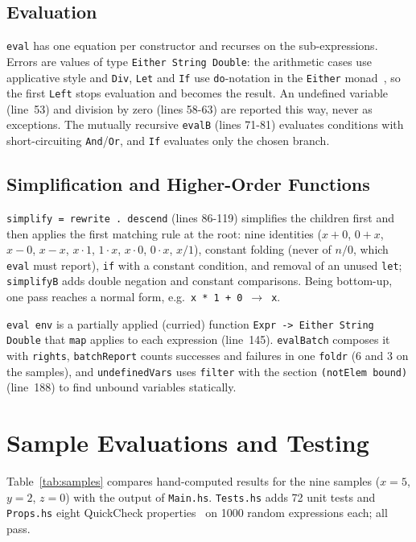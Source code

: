\documentclass[12pt, a4paper]{report}
\newcommand{\code}[1]{\texttt{#1}}
\begin{document}
\subsection{Evaluation}

\code{eval} has one equation per constructor and recurses on the
sub-expressions. Errors are values of type \code{Either String Double}: the
arithmetic cases use applicative style and \code{Div}, \code{Let} and
\code{If} use \code{do}-notation in the \code{Either}
monad~\cite{wadler1995monads}, so the first \code{Left} stops evaluation and
becomes the result. An undefined variable (line~53) and division by zero
(lines 58-63) are reported this way, never as exceptions. The mutually
recursive \code{evalB} (lines 71-81) evaluates conditions with
short-circuiting \code{And}/\code{Or}, and \code{If} evaluates only the chosen
branch.

\subsection{Simplification and Higher-Order Functions}
\code{simplify = rewrite . descend} (lines 86-119) simplifies the children
first and then applies the first matching rule at the root: nine identities
($x+0$, $0+x$, $x-0$, $x-x$, $x \cdot 1$, $1 \cdot x$, $x \cdot 0$,
$0 \cdot x$, $x/1$), constant folding (never of $n/0$, which \code{eval} must
report), \code{if} with a constant condition, and removal of an unused
\code{let}; \code{simplifyB} adds double negation and constant comparisons.
Being bottom-up, one pass reaches a normal form, e.g.\
\code{x * 1 + 0}~$\to$~\code{x}.

\code{eval env} is a partially applied (curried) function
\code{Expr -> Either String Double} that \code{map} applies to each expression
(line~145). \code{evalBatch} composes it with \code{rights}, \code{batchReport}
counts successes and failures in one \code{foldr} (6 and 3 on the samples),
and \code{undefinedVars} uses \code{filter} with the section
\code{(\textasciigrave notElem\textasciigrave{} bound)} (line~188) to find unbound variables statically.

\section{Sample Evaluations and Testing}\label{sec:samples}
Table~\ref{tab:samples} compares hand-computed results for the nine samples
($x=5$, $y=2$, $z=0$) with the output of \code{Main.hs}. \code{Tests.hs} adds
72 unit tests and \code{Props.hs} eight QuickCheck
properties~\cite{claessen2000quickcheck} on 1000 random expressions each; all
pass.
\end{document}
